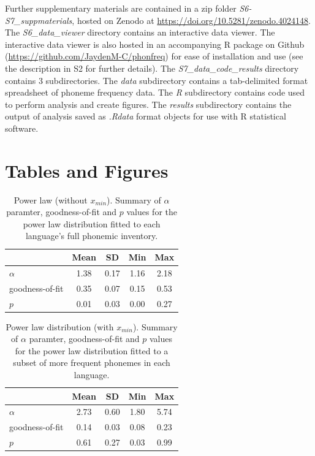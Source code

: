 Further supplementary materials are contained in a zip folder \emph{S6-S7\_suppmaterials}, hosted on Zenodo at \url{https://doi.org/10.5281/zenodo.4024148}. The \emph{S6\_data\_viewer} directory contains an interactive data viewer. The interactive data viewer is also hosted in an accompanying R package on Github (\url{https://github.com/JaydenM-C/phonfreq}) for ease of installation and use (see the description in S2 for further details). The \emph{S7\_data\_code\_results} directory contains 3 subdirectories. The \emph{data} subdirectory contains a tab-delimited format spreadsheet of phoneme frequency data. The \emph{R} subdirectory contains code used to perform analysis and create figures. The \emph{results} subdirectory contains the output of analysis saved as \emph{.Rdata} format objects for use with R statistical software.


\hypertarget{tables-and-figures}{%
\section*{Tables and Figures}\label{tables-and-figures}}

\begin{table}[!h]

\caption{\label{tab:pl-summary}Power law (without $x_{min}$). Summary of $\alpha$ paramter, goodness-of-fit and $p$ values for the power law distribution fitted to each language's full phonemic inventory.}
\centering
\begin{tabular}[t]{lcccc}
\toprule
\textbf{ } & \textbf{Mean} & \textbf{SD} & \textbf{Min} & \textbf{Max}\\
\midrule
$\alpha$ & 1.38 & 0.17 & 1.16 & 2.18\\
goodness-of-fit & 0.35 & 0.07 & 0.15 & 0.53\\
$p$ & 0.01 & 0.03 & 0.00 & 0.27\\
\bottomrule
\end{tabular}
\end{table}

\begin{table}[!h]

\caption{\label{tab:pl-xmin-summary}Power law distribution (with $x_{min}$). Summary of $\alpha$ paramter, goodness-of-fit and $p$ values for the power law distribution fitted to a subset of more frequent phonemes in each language.}
\centering
\begin{tabular}[t]{lcccc}
\toprule
\textbf{ } & \textbf{Mean} & \textbf{SD} & \textbf{Min} & \textbf{Max}\\
\midrule
$\alpha$ & 2.73 & 0.60 & 1.80 & 5.74\\
goodness-of-fit & 0.14 & 0.03 & 0.08 & 0.23\\
$p$ & 0.61 & 0.27 & 0.03 & 0.99\\
\bottomrule
\end{tabular}
\end{table}

